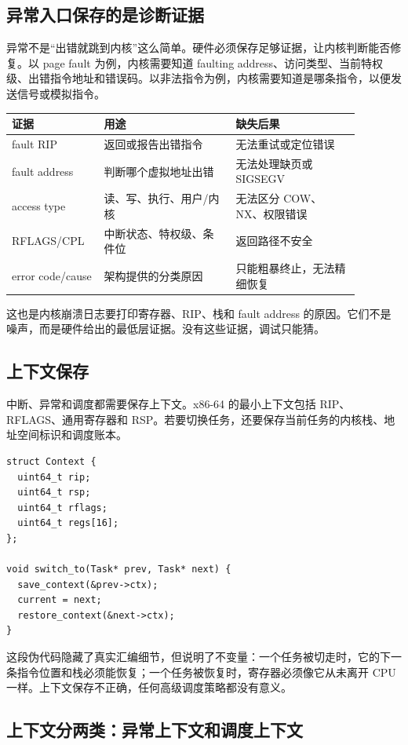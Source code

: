 \subsection{异常入口保存的是诊断证据}

异常不是“出错就跳到内核”这么简单。硬件必须保存足够证据，让内核判断能否修复。以 page fault 为例，内核需要知道 faulting address、访问类型、当前特权级、出错指令地址和错误码。以非法指令为例，内核需要知道是哪条指令，以便发送信号或模拟指令。

\begin{longtable}{p{0.22\linewidth}p{0.34\linewidth}p{0.32\linewidth}}
\toprule
证据 & 用途 & 缺失后果 \\
\midrule
fault RIP & 返回或报告出错指令 & 无法重试或定位错误 \\
fault address & 判断哪个虚拟地址出错 & 无法处理缺页或 SIGSEGV \\
access type & 读、写、执行、用户/内核 & 无法区分 COW、NX、权限错误 \\
RFLAGS/CPL & 中断状态、特权级、条件位 & 返回路径不安全 \\
error code/cause & 架构提供的分类原因 & 只能粗暴终止，无法精细恢复 \\
\bottomrule
\end{longtable}

这也是内核崩溃日志要打印寄存器、RIP、栈和 fault address 的原因。它们不是噪声，而是硬件给出的最低层证据。没有这些证据，调试只能猜。

\subsection{上下文保存}

中断、异常和调度都需要保存上下文。x86-64 的最小上下文包括 RIP、RFLAGS、通用寄存器和 RSP。若要切换任务，还要保存当前任务的内核栈、地址空间标识和调度账本。

\begin{lstlisting}
struct Context {
  uint64_t rip;
  uint64_t rsp;
  uint64_t rflags;
  uint64_t regs[16];
};

void switch_to(Task* prev, Task* next) {
  save_context(&prev->ctx);
  current = next;
  restore_context(&next->ctx);
}
\end{lstlisting}

这段伪代码隐藏了真实汇编细节，但说明了不变量：一个任务被切走时，它的下一条指令位置和栈必须能恢复；一个任务被恢复时，寄存器必须像它从未离开 CPU 一样。上下文保存不正确，任何高级调度策略都没有意义。

\subsection{上下文分两类：异常上下文和调度上下文}

